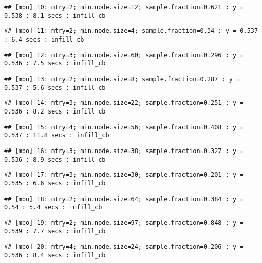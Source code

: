 \documentclass[
]{article}
\begin{document}
\begin{verbatim}
## [mbo] 10: mtry=2; min.node.size=12; sample.fraction=0.621 : y = 0.538 : 8.1 secs : infill_cb
\end{verbatim}

\begin{verbatim}
## [mbo] 11: mtry=2; min.node.size=4; sample.fraction=0.34 : y = 0.537 : 6.4 secs : infill_cb
\end{verbatim}

\begin{verbatim}
## [mbo] 12: mtry=3; min.node.size=60; sample.fraction=0.296 : y = 0.536 : 7.5 secs : infill_cb
\end{verbatim}

\begin{verbatim}
## [mbo] 13: mtry=2; min.node.size=8; sample.fraction=0.287 : y = 0.537 : 5.6 secs : infill_cb
\end{verbatim}

\begin{verbatim}
## [mbo] 14: mtry=3; min.node.size=22; sample.fraction=0.251 : y = 0.536 : 8.2 secs : infill_cb
\end{verbatim}

\begin{verbatim}
## [mbo] 15: mtry=4; min.node.size=56; sample.fraction=0.408 : y = 0.537 : 11.8 secs : infill_cb
\end{verbatim}

\begin{verbatim}
## [mbo] 16: mtry=3; min.node.size=38; sample.fraction=0.327 : y = 0.536 : 8.9 secs : infill_cb
\end{verbatim}

\begin{verbatim}
## [mbo] 17: mtry=3; min.node.size=30; sample.fraction=0.201 : y = 0.535 : 6.6 secs : infill_cb
\end{verbatim}

\begin{verbatim}
## [mbo] 18: mtry=2; min.node.size=64; sample.fraction=0.384 : y = 0.54 : 5.4 secs : infill_cb
\end{verbatim}

\begin{verbatim}
## [mbo] 19: mtry=2; min.node.size=97; sample.fraction=0.848 : y = 0.539 : 7.7 secs : infill_cb
\end{verbatim}

\begin{verbatim}
## [mbo] 20: mtry=4; min.node.size=24; sample.fraction=0.206 : y = 0.536 : 8.4 secs : infill_cb
\end{verbatim}
\end{document}
